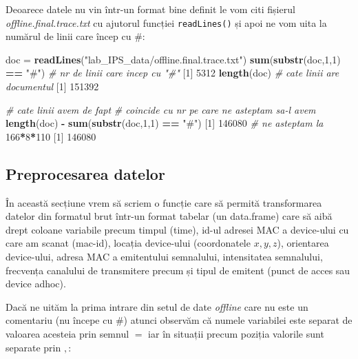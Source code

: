 \documentclass[]{article}
\newenvironment{Shaded}{\begin{snugshade}}{\end{snugshade}}
\newcommand{\KeywordTok}[1]{\textcolor[rgb]{0.13,0.29,0.53}{\textbf{#1}}}
\newcommand{\DecValTok}[1]{\textcolor[rgb]{0.00,0.00,0.81}{#1}}
\newcommand{\StringTok}[1]{\textcolor[rgb]{0.31,0.60,0.02}{#1}}
\newcommand{\CommentTok}[1]{\textcolor[rgb]{0.56,0.35,0.01}{\textit{#1}}}
\newcommand{\OperatorTok}[1]{\textcolor[rgb]{0.81,0.36,0.00}{\textbf{#1}}}
\newcommand{\NormalTok}[1]{#1}
\begin{document}
Deoarece datele nu vin într-un format bine definit le vom citi fișierul
\emph{offline.final.trace.txt} cu ajutorul funcției \texttt{readLines()}
și apoi ne vom uita la numărul de linii care încep cu \(\#\):

\begin{Shaded}
\begin{Highlighting}[]
\NormalTok{doc =}\StringTok{ }\KeywordTok{readLines}\NormalTok{(}\StringTok{"lab_IPS_data/offline.final.trace.txt"}\NormalTok{)}
\KeywordTok{sum}\NormalTok{(}\KeywordTok{substr}\NormalTok{(doc,}\DecValTok{1}\NormalTok{,}\DecValTok{1}\NormalTok{) }\OperatorTok{==}\StringTok{ "#"}\NormalTok{) }\CommentTok{# nr de linii care incep cu "#"}
\NormalTok{[}\DecValTok{1}\NormalTok{] }\DecValTok{5312}
\KeywordTok{length}\NormalTok{(doc) }\CommentTok{# cate linii are documentul}
\NormalTok{[}\DecValTok{1}\NormalTok{] }\DecValTok{151392}

\CommentTok{# cate linii avem de fapt }
\CommentTok{# coincide cu nr pe care ne asteptam sa-l avem }
\KeywordTok{length}\NormalTok{(doc) }\OperatorTok{-}\StringTok{ }\KeywordTok{sum}\NormalTok{(}\KeywordTok{substr}\NormalTok{(doc,}\DecValTok{1}\NormalTok{,}\DecValTok{1}\NormalTok{) }\OperatorTok{==}\StringTok{ "#"}\NormalTok{) }
\NormalTok{[}\DecValTok{1}\NormalTok{] }\DecValTok{146080}
\CommentTok{# ne asteptam la }
\DecValTok{166}\OperatorTok{*}\DecValTok{8}\OperatorTok{*}\DecValTok{110} 
\NormalTok{[}\DecValTok{1}\NormalTok{] }\DecValTok{146080}
\end{Highlighting}
\end{Shaded}

\subsection{Preprocesarea datelor}\label{preprocesarea-datelor}

În această secțiune vrem să scriem o funcție care să permită
transformarea datelor din formatul brut într-un format tabelar (un
data.frame) care să aibă drept coloane variabile precum timpul (time),
id-ul adresei MAC a device-ului cu care am scanat (mac-id), locația
device-ului (coordonatele \(x,y,z\)), orientarea device-ului, adresa MAC
a emitentului semnalului, intensitatea semnalului, frecvența canalului
de transmitere precum și tipul de emitent (punct de acces sau device
adhoc).

Dacă ne uităm la prima intrare din setul de date \emph{offline} care nu
este un comentariu (nu începe cu \(\#\)) atunci observăm că numele
variabilei este separat de valoarea acesteia prin semnul \(=\) iar în
situații precum poziția valorile sunt separate prin \(,\):
\end{document}

